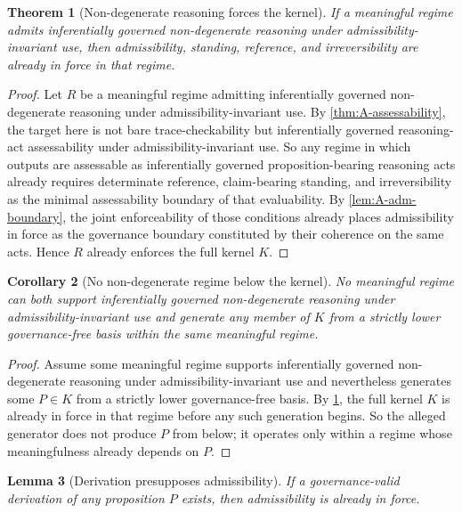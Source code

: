 \documentclass[11pt]{article}
\theoremstyle{plain}
\newtheorem{theorem}{Theorem}[section]
\newtheorem{lemma}[theorem]{Lemma}
\newtheorem{corollary}[theorem]{Corollary}
\theoremstyle{definition}
\begin{document}
\begin{theorem}[Non-degenerate reasoning forces the kernel]
\label{thm:A-kernel}
If a meaningful regime admits inferentially governed non-degenerate reasoning under admissibility-invariant use, then admissibility, standing, reference, and irreversibility are already in force in that regime.
\end{theorem}

\begin{proof}
Let $R$ be a meaningful regime admitting inferentially governed non-degenerate reasoning under admissibility-invariant use. By \cref{thm:A-assessability}, the target here is not bare trace-checkability but inferentially governed reasoning-act assessability under admissibility-invariant use. So any regime in which outputs are assessable as inferentially governed proposition-bearing reasoning acts already requires determinate reference, claim-bearing standing, and irreversibility as the minimal assessability boundary of that evaluability. By \cref{lem:A-adm-boundary}, the joint enforceability of those conditions already places admissibility in force as the governance boundary constituted by their coherence on the same acts. Hence $R$ already enforces the full kernel $K$.
\end{proof}

\begin{corollary}[No non-degenerate regime below the kernel]
\label{cor:A-no-below-kernel}
No meaningful regime can both support inferentially governed non-degenerate reasoning under admissibility-invariant use and generate any member of $K$ from a strictly lower governance-free basis within the same meaningful regime.
\end{corollary}

\begin{proof}
Assume some meaningful regime supports inferentially governed non-degenerate reasoning under admissibility-invariant use and nevertheless generates some $P\in K$ from a strictly lower governance-free basis. By \cref{thm:A-kernel}, the full kernel $K$ is already in force in that regime before any such generation begins. So the alleged generator does not produce $P$ from below; it operates only within a regime whose meaningfulness already depends on $P$.
\end{proof}

\begin{lemma}[Derivation presupposes admissibility]
\label{lem:A-der-adm}
If a governance-valid derivation of any proposition $P$ exists, then admissibility is already in force.
\end{lemma}
\end{document}
